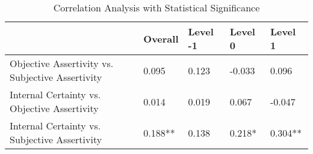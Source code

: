\begin{table}
\caption{Correlation Analysis with Statistical Significance}
\label{tab:correlations}
\begin{tabular}{lllll}
\toprule
 & Overall & Level -1 & Level 0 & Level 1 \\
\midrule
Objective Assertivity vs. Subjective Assertivity & 0.095 & 0.123 & -0.033 & 0.096 \\
Internal Certainty vs. Objective Assertivity & 0.014 & 0.019 & 0.067 & -0.047 \\
Internal Certainty vs. Subjective Assertivity & 0.188** & 0.138 & 0.218* & 0.304** \\
\bottomrule
\end{tabular}
\end{table}
